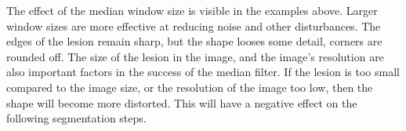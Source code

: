 The effect of the median window size is visible in the examples above. Larger window sizes are more effective at reducing noise and other disturbances. The edges of the lesion remain sharp, but the shape looses some detail, corners are rounded off. The size of the lesion in the image, and the image’s resolution are also important factors in the success of the median filter. If the lesion is too small compared to the image size, or the resolution of the image too low, then the shape will become more distorted. This will have a negative effect on the following segmentation steps.